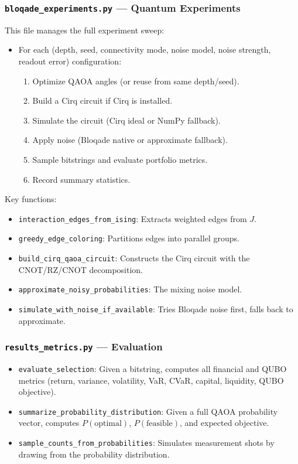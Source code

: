\documentclass[12pt, a4paper]{article}
\begin{document}
\subsubsection{\texttt{bloqade\_experiments.py} --- Quantum Experiments}

This file manages the full experiment sweep:

\begin{itemize}
    \item For each (depth, seed, connectivity mode, noise model, noise strength, readout error) configuration:
    \begin{enumerate}
        \item Optimize QAOA angles (or reuse from same depth/seed).
        \item Build a Cirq circuit if Cirq is installed.
        \item Simulate the circuit (Cirq ideal or NumPy fallback).
        \item Apply noise (Bloqade native or approximate fallback).
        \item Sample bitstrings and evaluate portfolio metrics.
        \item Record summary statistics.
    \end{enumerate}
\end{itemize}

Key functions:
\begin{itemize}
    \item \texttt{interaction\_edges\_from\_ising}: Extracts weighted edges from $J$.
    \item \texttt{greedy\_edge\_coloring}: Partitions edges into parallel groups.
    \item \texttt{build\_cirq\_qaoa\_circuit}: Constructs the Cirq circuit with the CNOT/RZ/CNOT decomposition.
    \item \texttt{approximate\_noisy\_probabilities}: The mixing noise model.
    \item \texttt{simulate\_with\_noise\_if\_available}: Tries Bloqade noise first, falls back to approximate.
\end{itemize}

\subsubsection{\texttt{results\_metrics.py} --- Evaluation}

\begin{itemize}
    \item \texttt{evaluate\_selection}: Given a bitstring, computes all financial and QUBO metrics (return, variance, volatility, VaR, CVaR, capital, liquidity, QUBO objective).
    \item \texttt{summarize\_probability\_distribution}: Given a full QAOA probability vector, computes $P(\text{optimal})$, $P(\text{feasible})$, and expected objective.
    \item \texttt{sample\_counts\_from\_probabilities}: Simulates measurement shots by drawing from the probability distribution.
\end{itemize}
\end{document}
